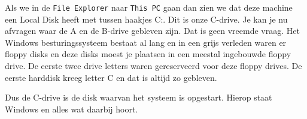 Als we in de \texttt{File Explorer} naar \texttt{This PC} gaan dan zien we dat deze machine een Local Disk heeft met tussen haakjes C:. Dit is onze C-drive. Je kan je nu afvragen waar de A en de B-drive gebleven zijn. Dat is geen vreemde vraag. Het Windows besturingssysteem bestaat al lang en in een grijs verleden waren er floppy disks en deze disks moest je plaatsen in een meestal ingebouwde floppy drive. De eerste twee drive letters waren gereserveerd voor deze floppy drives. De eerste harddisk kreeg letter C en dat is altijd zo gebleven.

Dus de C-drive is de disk waarvan het systeem is opgestart. Hierop staat Windows en alles wat daarbij hoort.

